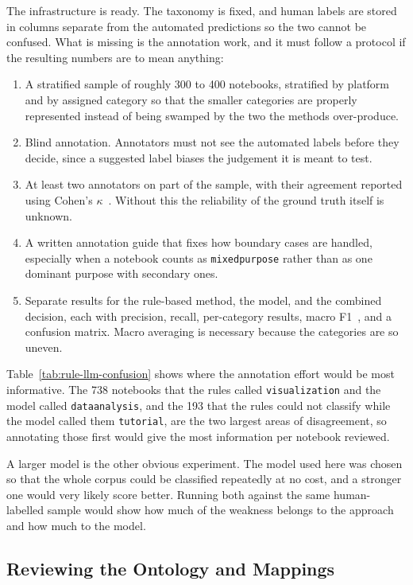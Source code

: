 The infrastructure is ready. The taxonomy is fixed, and human labels are stored in columns separate from the automated predictions so the two cannot be confused. What is missing is the annotation work, and it must follow a protocol if the resulting numbers are to mean anything:

\begin{enumerate}[leftmargin=1.4em,itemsep=0.3em]
\item A stratified sample of roughly 300 to 400 notebooks, stratified by platform and by assigned category so that the smaller categories are properly represented instead of being swamped by the two the methods over-produce.
\item Blind annotation. Annotators must not see the automated labels before they decide, since a suggested label biases the judgement it is meant to test.
\item At least two annotators on part of the sample, with their agreement reported using Cohen's $\kappa$~\cite{cohen1960kappa}. Without this the reliability of the ground truth itself is unknown.
\item A written annotation guide that fixes how boundary cases are handled, especially when a notebook counts as \texttt{mixed\ub purpose} rather than as one dominant purpose with secondary ones.
\item Separate results for the rule-based method, the model, and the combined decision, each with precision, recall, per-category results, macro F1~\cite{sokolova2009fmeasure}, and a confusion matrix. Macro averaging is necessary because the categories are so uneven.
\end{enumerate}

Table~\ref{tab:rule-llm-confusion} shows where the annotation effort would be most informative. The 738 notebooks that the rules called \texttt{visualization} and the model called \texttt{data\ub analysis}, and the 193 that the rules could not classify while the model called them \texttt{tutorial}, are the two largest areas of disagreement, so annotating those first would give the most information per notebook reviewed.

A larger model is the other obvious experiment. The model used here was chosen so that the whole corpus could be classified repeatedly at no cost, and a stronger one would very likely score better. Running both against the same human-labelled sample would show how much of the weakness belongs to the approach and how much to the model.

\subsection{Reviewing the Ontology and Mappings}

